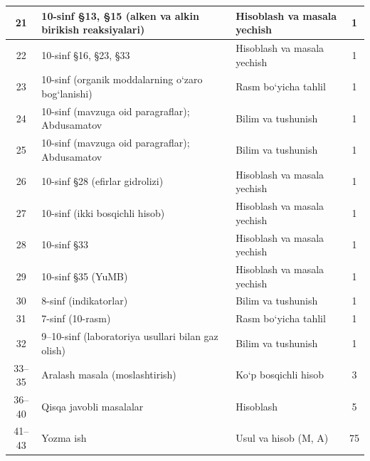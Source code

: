 \documentclass[11pt,a4paper]{article}
\begin{document}
{\begin{longtable}{|c|p{7.2cm}|p{5.4cm}|c|}
21 & 10-sinf \S{}13, \S{}15 (alken va alkin birikish reaksiyalari) & Hisoblash va masala yechish & 1\\\hline
22 & 10-sinf \S{}16, \S{}23, \S{}33 & Hisoblash va masala yechish & 1\\\hline
23 & 10-sinf (organik moddalarning o`zaro bog`lanishi) & Rasm bo`yicha tahlil & 1\\\hline
24 & 10-sinf (mavzuga oid paragraflar); Abdusamatov & Bilim va tushunish & 1\\\hline
25 & 10-sinf (mavzuga oid paragraflar); Abdusamatov & Bilim va tushunish & 1\\\hline
26 & 10-sinf \S{}28 (efirlar gidrolizi) & Hisoblash va masala yechish & 1\\\hline
27 & 10-sinf (ikki bosqichli hisob) & Hisoblash va masala yechish & 1\\\hline
28 & 10-sinf \S{}33 & Hisoblash va masala yechish & 1\\\hline
29 & 10-sinf \S{}35 (YuMB) & Hisoblash va masala yechish & 1\\\hline
30 & 8-sinf (indikatorlar) & Bilim va tushunish & 1\\\hline
31 & 7-sinf (10-rasm) & Rasm bo`yicha tahlil & 1\\\hline
32 & 9--10-sinf (laboratoriya usullari bilan gaz olish) & Bilim va tushunish & 1\\\hline
33--35 & Aralash masala (moslashtirish) & Ko`p bosqichli hisob & 3\\\hline
36--40 & Qisqa javobli masalalar & Hisoblash & 5\\\hline
41--43 & Yozma ish & Usul va hisob (M, A) & 75\\\hline
\end{longtable}}
\end{document}
